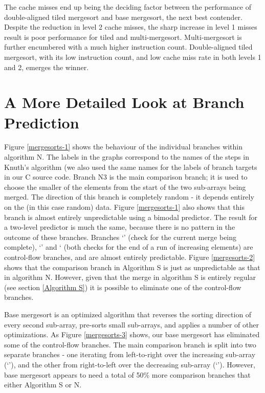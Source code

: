 The cache misses end up being the deciding factor between the performance of
double-aligned tiled mergesort and base mergesort, the next best contender.
Despite the reduction in level 2 cache misses, the sharp increase in level 1
misses result is poor performance for tiled and multi-mergesort. Multi-mergesort
is further encumbered with a much higher instruction count. Double-aligned tiled
mergesort, with its low instruction count, and low cache miss rate in both
levels 1 and 2, emerges the winner.

\section{A More Detailed Look at Branch Prediction}


Figure \ref{mergesorts-1} shows the behaviour of the individual branches within
algorithm N. The labels in the graphs correspond to the names of the steps in
Knuth's algorithm (we also used the same names for the labels of branch targets
in our C source code. Branch N3 is the main comparison branch; it is used to
choose the smaller of the elements from the start of the two sub-arrays being
merged. The direction of this branch is completely random - it depends entirely
on the (in this case random) data. Figure \ref{mergesorts-1} also shows that
this branch is almost entirely unpredictable using a bimodal predictor. The
result for a two-level predictor is much the same, because there is no pattern
in the outcome of these branches. Branches `' (check for the current
merge being complete), `' and ` (both checks for the end of a run of
increasing elements) are control-flow branches, and are almost entirely
predictable. Figure \ref{mergesorts-2} shows that the comparison branch in
Algorithm S is just as unpredictable as that in algorithm N. However, given that
the merge in algorithm S is entirely regular (see section \ref{Algorithm S}) it
is possible to eliminate one of the control-flow branches.

Base mergesort is an optimized algorithm that reverses the sorting direction of
every second sub-array, pre-sorts small sub-arrays, and applies a number of
other optimizations. As Figure \ref{mergesorts-3} shows, our base mergesort has
eliminated some of the control-flow branches. The main comparison branch is
split into two separate branches - one iterating from left-to-right over the
increasing sub-array (`'), and the other from right-to-left over the
decreasing sub-array (`'). However, base mergesort appears to need a
total of 50\% more comparison branches that either Algorithm S or N.

